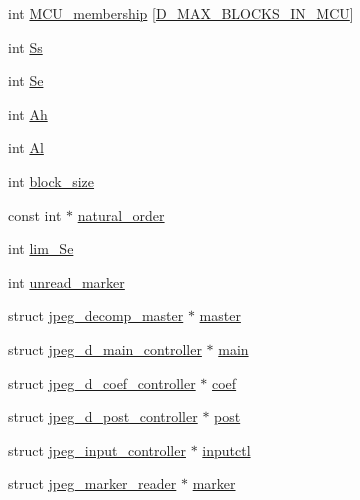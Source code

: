 \begin{DoxyCompactItemize}
int \hyperlink{structjpeg__decompress__struct_abcd46ef2fd7c068bdbdcde43efbd786e}{M\+C\+U\+\_\+membership} \mbox{[}\hyperlink{jpeglib_8h_af974a668decc270fb4d00587618dd110}{D\+\_\+\+M\+A\+X\+\_\+\+B\+L\+O\+C\+K\+S\+\_\+\+I\+N\+\_\+\+M\+C\+U}\mbox{]}
\item 
int \hyperlink{structjpeg__decompress__struct_a61133b3e8959b3ab4ead2b6e12761176}{Ss}
\item 
int \hyperlink{structjpeg__decompress__struct_a978242a8eb6c75dbb86e8382470b2290}{Se}
\item 
int \hyperlink{structjpeg__decompress__struct_a2df559c55319d0c785b91e95960bea55}{Ah}
\item 
int \hyperlink{structjpeg__decompress__struct_a1dfbdcc8449dbc329a352a75d4046154}{Al}
\item 
int \hyperlink{structjpeg__decompress__struct_a18f5caeead3dbaf5dfebf7aa08e3ee3f}{block\+\_\+size}
\item 
const int $\ast$ \hyperlink{structjpeg__decompress__struct_a45b7a03343d61800942cee3001f73bdb}{natural\+\_\+order}
\item 
int \hyperlink{structjpeg__decompress__struct_acd2e6ff14b5a6109ae04baf754dd5965}{lim\+\_\+\+Se}
\item 
int \hyperlink{structjpeg__decompress__struct_a9a030e86e1bfd0a72c520e1d18b5eef9}{unread\+\_\+marker}
\item 
struct \hyperlink{structjpeg__decomp__master}{jpeg\+\_\+decomp\+\_\+master} $\ast$ \hyperlink{structjpeg__decompress__struct_ace69c5c5534a5de5b54d9c4dcd224fe6}{master}
\item 
struct \hyperlink{structjpeg__d__main__controller}{jpeg\+\_\+d\+\_\+main\+\_\+controller} $\ast$ \hyperlink{structjpeg__decompress__struct_aab13271d039318135ee5ca434e96c34d}{main}
\item 
struct \hyperlink{structjpeg__d__coef__controller}{jpeg\+\_\+d\+\_\+coef\+\_\+controller} $\ast$ \hyperlink{structjpeg__decompress__struct_a25ff493a838c250917bf874a70bdb6f2}{coef}
\item 
struct \hyperlink{structjpeg__d__post__controller}{jpeg\+\_\+d\+\_\+post\+\_\+controller} $\ast$ \hyperlink{structjpeg__decompress__struct_aa23ccd90094cf7cf11f8f688eb28988e}{post}
\item 
struct \hyperlink{structjpeg__input__controller}{jpeg\+\_\+input\+\_\+controller} $\ast$ \hyperlink{structjpeg__decompress__struct_aba60d9f35b5b2357fd7d9b28809cb087}{inputctl}
\item 
struct \hyperlink{structjpeg__marker__reader}{jpeg\+\_\+marker\+\_\+reader} $\ast$ \hyperlink{structjpeg__decompress__struct_a59a6ada58d57b412fe89e1a531323b50}{marker}

\end{DoxyCompactItemize}

